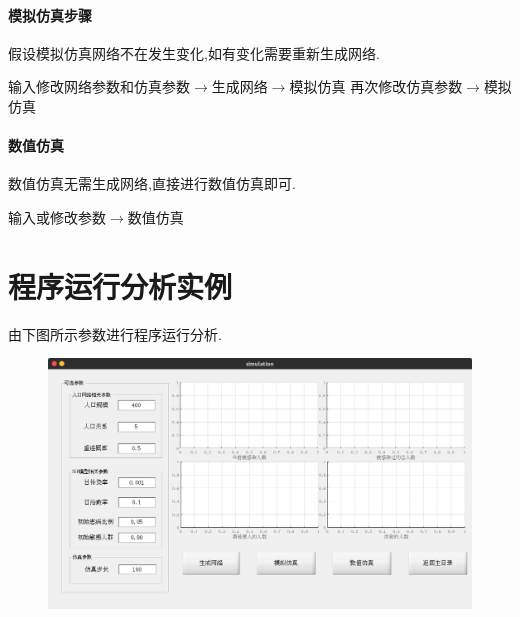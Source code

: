 \documentclass[supercite]{HustGraduPaper}
\begin{document}
	\paragraph{模拟仿真步骤}
	假设模拟仿真网络不在发生变化,如有变化需要重新生成网络.\par
	输入修改网络参数和仿真参数$\to$生成网络$\to$模拟仿真
	再次修改仿真参数$\to$模拟仿真

	\paragraph{数值仿真}
	数值仿真无需生成网络,直接进行数值仿真即可.\par
	输入或修改参数$\to$数值仿真

	\section{程序运行分析实例}
	由下图所示参数进行程序运行分析.
	\begin{figure}[H]
		\centering
		\includegraphics[scale=0.3]{Figures/simu.png}
	\end{figure} 
\end{document}
